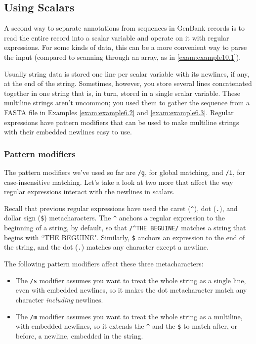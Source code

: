 \subsection{Using Scalars}
A second way to separate annotations from sequences in GenBank records is to read the entire record into a scalar variable and operate on it with regular expressions. For some kinds of data, this can be a more convenient way to parse the input (compared to scanning through an array, as in \autoref{exam:example10.1}).

Usually string data is stored one line per scalar variable with its newlines, if any, at the end of the string. Sometimes, however, you store several lines concatenated together in one string that is, in turn, stored in a single scalar variable. These multiline strings aren't uncommon; you used them to gather the sequence from a FASTA file in Examples \autoref{exam:example6.2} and \autoref{exam:example6.3}. Regular expressions have pattern modifiers that can be used to make multiline strings with their embedded newlines easy to use.

\subsubsection{Pattern modifiers}
The pattern modifiers we've used so far are \verb|/g|, for global matching, and \verb|/i|, for case-insensitive matching. Let's take a look at two more that affect the way regular expressions interact with the newlines in scalars.

Recall that previous regular expressions have used the caret (\verb|^|), dot (\verb|.|), and dollar sign (\verb|$|) metacharacters. The \verb|^| anchors a regular expression to the beginning of a string, by default, so that \verb|/^THE BEGUINE/| matches a string that begins with ``THE BEGUINE". Similarly, \verb|$| anchors an expression to the end of the string, and the dot (\verb|.|) matches any character except a newline.

The following pattern modifiers affect these three metacharacters:

\begin{itemize}
  \item The \verb|/s| modifier assumes you want to treat the whole string as a single line, even with embedded newlines, so it makes the dot metacharacter match any character \textit{including} newlines.
  \item The \verb|/m| modifier assumes you want to treat the whole string as a multiline, with embedded newlines, so it extends the \verb|^| and the \verb|$| to match after, or before, a newline, embedded in the string.
\end{itemize}

